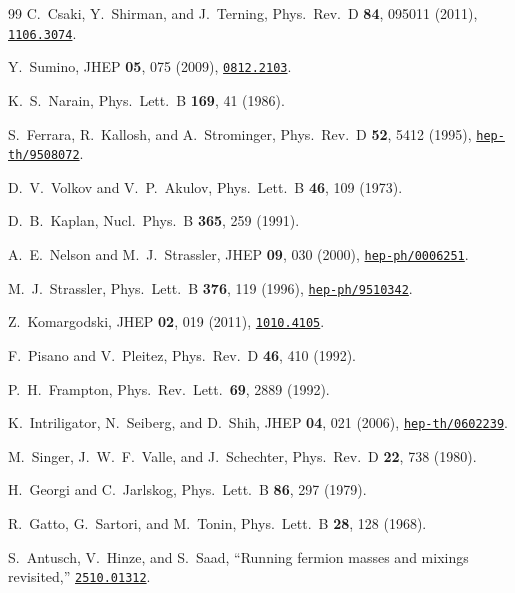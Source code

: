 \documentclass[12pt,a4paper]{article}
\begin{document}
\begin{thebibliography}{99}
  C.~Csaki, Y.~Shirman, and J.~Terning,
  Phys.\ Rev.\ D \textbf{84}, 095011 (2011),
  \href{https://arxiv.org/abs/1106.3074}{\texttt{1106.3074}}.

  Y.~Sumino,
  JHEP \textbf{05}, 075 (2009),
  \href{https://arxiv.org/abs/0812.2103}{\texttt{0812.2103}}.

  K.~S.~Narain,
  Phys.\ Lett.\ B \textbf{169}, 41 (1986).

  S.~Ferrara, R.~Kallosh, and A.~Strominger,
  Phys.\ Rev.\ D \textbf{52}, 5412 (1995),
  \href{https://arxiv.org/abs/hep-th/9508072}{\texttt{hep-th/9508072}}.

  D.~V.~Volkov and V.~P.~Akulov,
  Phys.\ Lett.\ B \textbf{46}, 109 (1973).

  D.~B.~Kaplan,
  Nucl.\ Phys.\ B \textbf{365}, 259 (1991).

  A.~E.~Nelson and M.~J.~Strassler,
  JHEP \textbf{09}, 030 (2000),
  \href{https://arxiv.org/abs/hep-ph/0006251}{\texttt{hep-ph/0006251}}.

  M.~J.~Strassler,
  Phys.\ Lett.\ B \textbf{376}, 119 (1996),
  \href{https://arxiv.org/abs/hep-ph/9510342}{\texttt{hep-ph/9510342}}.

  Z.~Komargodski,
  JHEP \textbf{02}, 019 (2011),
  \href{https://arxiv.org/abs/1010.4105}{\texttt{1010.4105}}.

  F.~Pisano and V.~Pleitez,
  Phys.\ Rev.\ D \textbf{46}, 410 (1992).

  P.~H.~Frampton,
  Phys.\ Rev.\ Lett.\ \textbf{69}, 2889 (1992).

  K.~Intriligator, N.~Seiberg, and D.~Shih,
  JHEP \textbf{04}, 021 (2006),
  \href{https://arxiv.org/abs/hep-th/0602239}{\texttt{hep-th/0602239}}.

  M.~Singer, J.~W.~F.~Valle, and J.~Schechter,
  Phys.\ Rev.\ D \textbf{22}, 738 (1980).

  H.~Georgi and C.~Jarlskog,
  Phys.\ Lett.\ B \textbf{86}, 297 (1979).

  R.~Gatto, G.~Sartori, and M.~Tonin,
  Phys.\ Lett.\ B \textbf{28}, 128 (1968).

  S.~Antusch, V.~Hinze, and S.~Saad,
  ``Running fermion masses and mixings revisited,''
  \href{https://arxiv.org/abs/2510.01312}{\texttt{2510.01312}}.


\end{thebibliography}
\end{document}
